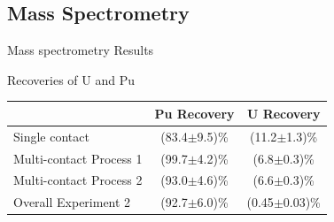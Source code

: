 \documentclass{beamer}
\begin{document}
\subsection{Mass Spectrometry}
\begin{frame}{Mass spectrometry Results}
  \begin{block}{Recoveries of U and Pu}
    \begin{center}
      \vskip -0.2cm
  \begin{tabular}{l  c  c}\toprule
                & Pu Recovery & U Recovery \\ \midrule \vspace{0.1cm}
   Single contact        & (83.4$\pm$9.5)\% & (11.2$\pm$1.3)\% \\
   Multi-contact Process 1 & (99.7$\pm$4.2)\% & (6.8$\pm$0.3)\% \\
   Multi-contact Process 2 & (93.0$\pm$4.6)\% & (6.6$\pm$0.3)\% \\
   Overall Experiment 2 & (92.7$\pm$6.0)\% & (0.45$\pm$0.03)\% \\ \bottomrule
  \end{tabular}
  \end{center}
  \end{block}
\end{frame}
\end{document}
